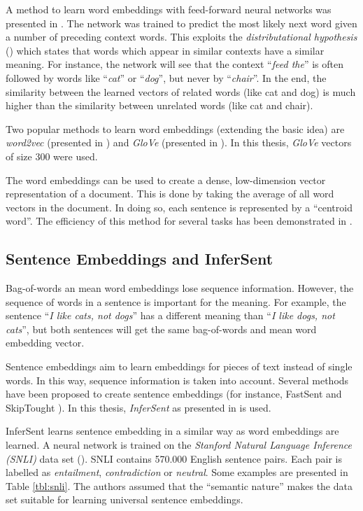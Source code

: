 A method to learn word embeddings with feed-forward neural networks was presented in \cite{bengio2003neural}. The network was trained to predict the most likely next word given a number of preceding context words. This exploits the \emph{distributational hypothesis} (\cite{harris1954distributional}) which states that words which appear in similar contexts have a similar meaning. For instance, the network will see that the context \enquote{\emph{feed the}} is often followed by words like \enquote{\emph{cat}} or \enquote{\emph{dog}}, but never by \enquote{\emph{chair}}. In the end, the similarity between the learned vectors of related words (like cat and dog) is much higher than the similarity between unrelated words (like cat and chair).

Two popular methods to learn word embeddings (extending the basic idea) are \emph{word2vec} (presented in \cite{NIPS2013_5021}) and \emph{GloVe} (presented in \cite{pennington2014glove}). In this thesis, \emph{GloVe} vectors of size 300 were used.

The word embeddings can be used to create a dense, low-dimension vector representation of a document. This is done by taking the average of all word vectors in the document. In doing so, each sentence is represented by a \enquote{centroid word}. The efficiency of this method for several tasks has been demonstrated in \cite{Wieting:2015aa}.

\subsection{Sentence Embeddings and InferSent}
Bag-of-words an mean word embeddings lose sequence information. However, the sequence of words in a sentence is important for the meaning. For example, the sentence \enquote{\emph{I like cats, not dogs}} has a different meaning than \enquote{\emph{I like dogs, not cats}}, but both sentences will get the same bag-of-words and mean word embedding vector.

Sentence embeddings aim to learn embeddings for pieces of text instead of single words. In this way, sequence information is taken into account. Several methods have been proposed to create sentence embeddings (for instance, FastSent \cite{hill2016learning} and SkipTought \cite{NIPS2015_5950}). In this thesis, \emph{InferSent} as presented in \cite{Conneau:2017aa} is used.


InferSent learns sentence embedding in a similar way as word embeddings are learned. A neural network is trained on the \emph{Stanford Natural Language Inference (SNLI)} data set (\cite{snli:emnlp2015}). SNLI contains 570.000 English sentence pairs. Each pair is labelled as \emph{entailment}, \emph{contradiction} or \emph{neutral}. Some examples are presented in Table \ref{tbl:snli}. The authors assumed that the \enquote{semantic nature} %
makes the data set suitable for learning universal sentence embeddings.

